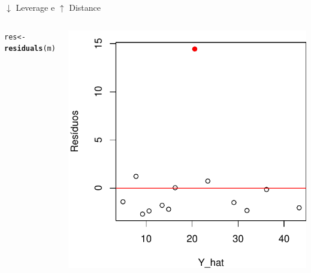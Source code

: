 \documentclass{beamer}\usepackage[]{graphicx}\usepackage[]{color}
\makeatletter
\newcommand{\hlstd}[1]{\textcolor[rgb]{0.345,0.345,0.345}{#1}}%
\newcommand{\hlkwb}[1]{\textcolor[rgb]{0.69,0.353,0.396}{#1}}%
\newcommand{\hlkwd}[1]{\textcolor[rgb]{0.737,0.353,0.396}{\textbf{#1}}}%
\newenvironment{kframe}{%
 \def\at@end@of@kframe{}%
 \ifinner\ifhmode%
  \def\at@end@of@kframe{\end{minipage}}%
  \begin{minipage}{\columnwidth}%
 \fi\fi%
 \def\FrameCommand##1{\hskip\@totalleftmargin \hskip-\fboxsep
 \colorbox{shadecolor}{##1}\hskip-\fboxsep
     \hskip-\linewidth \hskip-\@totalleftmargin \hskip\columnwidth}%
 \MakeFramed {\advance\hsize-\width
   \@totalleftmargin\z@ \linewidth\hsize
   \@setminipage}}%
 {\par\unskip\endMakeFramed%
 \at@end@of@kframe}
\newenvironment{knitrout}{}{} %
\renewenvironment{knitrout}{\setlength{\topsep}{0mm}}{}
\makeatother
\begin{document}
\begin{frame}{$\downarrow$ Leverage e $\uparrow$ Distance}
\begin{columns}[c]
\begin{knitrout}
\end{knitrout}
\pause
{}
\begin{knitrout}\tiny
{}\color{fgcolor}\begin{kframe}
\begin{alltt}
\hlstd{res} \hlkwb{<-} \hlkwd{residuals}\hlstd{(m)}
\end{alltt}
\end{kframe}
\includegraphics[width=1\linewidth]{figure/inf200-1} 

\end{knitrout}

\end{columns}
\end{frame}
\end{document}
